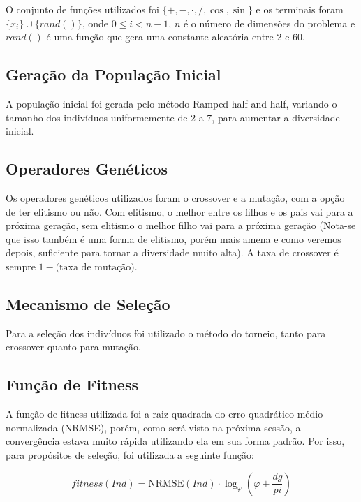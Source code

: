 \documentclass[10pt,twocolumn,letterpaper]{article}
\begin{document}
O conjunto de funções utilizados foi $\{+,-,\cdot, /, \cos, \sin\}$ e os terminais foram
$\{x_i\} \cup \{rand()\}$, onde $0 \le i < n-1$, $n$ é o número de dimensões do problema e $rand()$ é uma função que gera uma constante aleatória entre 2 e 60.

\subsection{Geração da População Inicial}

A população inicial foi gerada pelo método Ramped half-and-half, variando o tamanho dos indivíduos uniformemente de 2 a 7, para aumentar a diversidade inicial.

\subsection{Operadores Genéticos}

Os operadores genéticos utilizados foram o crossover e a mutação, com a opção de ter elitismo ou não. Com elitismo, o melhor entre os filhos e os pais vai para a próxima geração, sem elitismo o melhor filho vai para a próxima geração (Nota-se que isso também é uma forma de elitismo, porém mais amena e como veremos depois, suficiente para tornar a diversidade muito alta). A taxa de crossover é sempre $1-\text{(taxa de mutação)}$.

\subsection{Mecanismo de Seleção}

Para a seleção dos indivíduos foi utilizado o método do torneio, tanto para crossover quanto para mutação.

\subsection{Função de Fitness}

A função de fitness utilizada foi a raiz quadrada do erro quadrático médio normalizada (NRMSE), porém, como será visto na próxima sessão, a convergência estava muito rápida utilizando ela em sua forma padrão. Por isso, para propósitos de seleção, foi utilizada a seguinte função:

\begin{equation}\label{eq:fitness}
fitness(Ind) = \text{NRMSE}(Ind) \cdot \log_\varphi\left(\varphi + \frac{dg}{pi}\right)
\end{equation}
\end{document}
